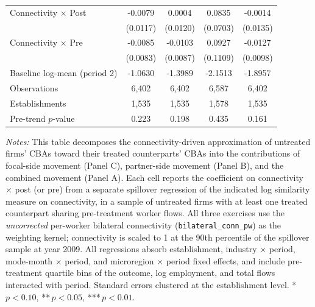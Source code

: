 \begin{table}[H]
\begin{tabular}{lcccc}
Connectivity $\times$ Post & -0.0079 & 0.0004 & 0.0835 & -0.0014 \\
 & (0.0117) & (0.0120) & (0.0703) & (0.0135) \\
Connectivity $\times$ Pre & -0.0085 & -0.0103 & 0.0927 & -0.0127 \\
 & (0.0083) & (0.0087) & (0.1109) & (0.0098) \\
Baseline log-mean (period 2) & -1.0630 & -1.3989 & -2.1513 & -1.8957 \\
Observations &        6,402 &        6,402 &        6,587 &        6,402 \\
Establishments &        1,535 &        1,535 &        1,578 &        1,535 \\
Pre-trend $p$-value & 0.223 & 0.198 & 0.435 & 0.161 \\
\hline
\hline\hline
\end{tabular}
\begin{minipage}{\linewidth}
\smallskip
\scriptsize\textit{Notes:} This table decomposes the connectivity-driven approximation of untreated firms' CBAs toward their treated counterparts' CBAs into the contributions of focal-side movement (Panel C), partner-side movement (Panel B), and the combined movement (Panel A). Each cell reports the coefficient on connectivity $\times$ post (or pre) from a separate spillover regression of the indicated log similarity measure on connectivity, in a sample of untreated firms with at least one treated counterpart sharing pre-treatment worker flows. All three exercises use the \emph{uncorrected} per-worker bilateral connectivity (\texttt{bilateral\_conn\_pw}) as the weighting kernel; connectivity is scaled to 1 at the 90th percentile of the spillover sample at year 2009. All regressions absorb establishment, industry $\times$ period, mode-month $\times$ period, and microregion $\times$ period fixed effects, and include pre-treatment quartile bins of the outcome, log employment, and total flows interacted with period. Standard errors clustered at the establishment level. *\,$p<0.10$, **\,$p<0.05$, ***\,$p<0.01$.
\end{minipage}
\end{table}
